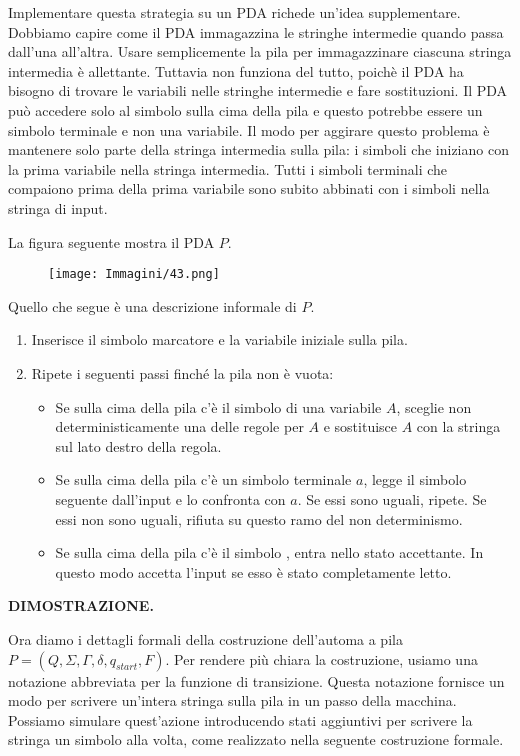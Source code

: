 \documentclass{article}
\begin{document}
Implementare questa strategia su un PDA richede un'idea supplementare.
Dobbiamo capire come il PDA immagazzina le stringhe intermedie quando passa dall'una all'altra. 
Usare semplicemente la pila per immagazzinare ciascuna stringa intermedia è allettante. 
Tuttavia non funziona del tutto, poichè il PDA ha bisogno di trovare le variabili nelle stringhe intermedie e fare sostituzioni. 
Il PDA può accedere solo al simbolo sulla cima della pila e questo potrebbe essere un simbolo terminale e non una variabile. 
Il modo per aggirare questo problema è mantenere solo parte della stringa intermedia sulla pila: i simboli che iniziano con la prima variabile nella stringa intermedia. 
Tutti i simboli terminali che compaiono prima della prima variabile sono subito abbinati con i simboli nella stringa di input.

La figura seguente mostra il PDA $P$.

\begin{figure}[H]
    \centering
    \texttt{[image: Immagini/43.png]}
    \label{fig:pda_example1}
\end{figure}

Quello che segue è una descrizione informale di $P$.
\begin{enumerate}
    \item Inserisce il simbolo marcatore \textdollar \text{ }e la variabile iniziale sulla pila.
    \item Ripete i seguenti passi finché la pila non è vuota:
    \begin{itemize}
        \item Se sulla cima della pila c'è il simbolo di una variabile $A$, sceglie non deterministicamente una delle regole per $A$ e sostituisce $A$ con la stringa sul lato destro della regola.
        \item Se sulla cima della pila c'è un simbolo terminale $a$, legge il simbolo seguente dall'input e lo confronta con $a$. Se essi sono uguali, ripete. Se essi non sono uguali, rifiuta su questo ramo del non determinismo.
        \item Se sulla cima della pila c'è il simbolo \textdollar \text{ }, entra nello stato accettante. In questo modo accetta l'input se esso è stato completamente letto.
    \end{itemize}
\end{enumerate}
\clearpage
 
\textbf{DIMOSTRAZIONE.}

Ora diamo i dettagli formali della costruzione dell'automa a pila $P = (Q,\Sigma,\Gamma,\delta,q_{start},F)$. 
Per rendere più chiara la costruzione, usiamo una notazione abbreviata per la funzione di transizione.
Questa notazione fornisce un modo per scrivere un'intera stringa sulla pila in un passo della macchina. 
Possiamo simulare quest'azione introducendo stati aggiuntivi per scrivere la stringa un simbolo alla volta, come realizzato nella seguente costruzione formale.
\end{document}
